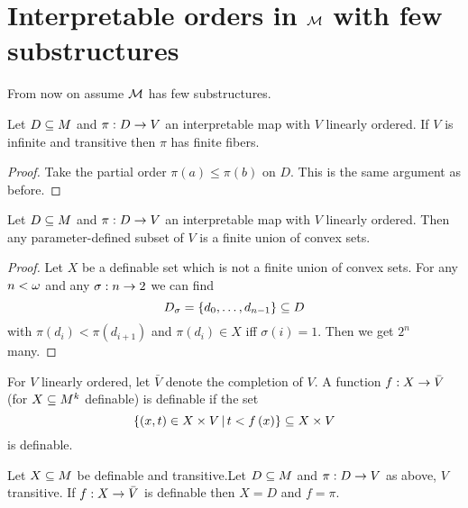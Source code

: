 \documentclass{amsart}
\begin{document}
\section{Interpretable orders in \texorpdfstring{$\mathcal{M}$}{M} with few substructures}

From now on assume $\mathcal{M}$ has few substructures. 

\begin{lem}
Let $D\subseteq M$ and $\pi: D\rightarrow V$ an interpretable map with $V$ linearly ordered. 
If $V$ is infinite and transitive then $\pi$ has finite fibers.
\end{lem}

\begin{proof}
Take the partial order $\pi\left(a\right)\leq
\pi\left(b\right)$ on $D$.
This is the same argument as before. 
\end{proof}

\begin{lem}
Let $D\subseteq M$ and $\pi: D\rightarrow V$ an interpretable map with $V$ linearly ordered. 
Then any parameter-defined subset of $V$ is a finite union of convex sets. 
\end{lem}

\begin{proof}
Let $X$ be a definable set which is not a finite union of convex sets.
For any $n < \omega$ and any $\sigma: n\rightarrow 2$ we can find 
\begin{equation}
D_\sigma = \left\{d_0 , \ldots , d_{n-1}\right\}\subseteq D
\end{equation}
with $\pi\left(d_i\right) < \pi\left(d_{i+1}\right)$ and $\pi\left(d_i\right)\in X$ iff
$\sigma\left(i\right) = 1$.
Then we get $2^n$ many.
\end{proof}

For $V$ linearly ordered, let $\bar V$ denote the completion of $V$. A
function $f: X\rightarrow \bar V$ (for $X\subseteq M^k$ definable) is definable if the set
\begin{equation}
\left\{ \left(x,t\right)\in X\times V \, \middle\vert \, t < f\left(x\right)\right\} \subseteq X\times V
\end{equation}
is definable.

\begin{lem}
Let $X\subseteq M$ be definable and transitive.Let $D\subseteq M$ and $\pi:D\rightarrow V$ as above, $V$
transitive. If $f:X\rightarrow \bar V$ is definable then $X = D$ and $f = \pi$.
\end{lem}
\end{document}
